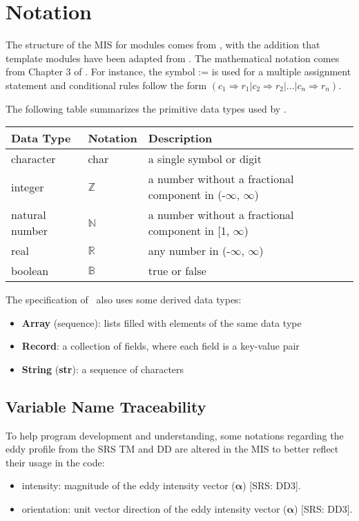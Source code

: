 \documentclass[12pt, titlepage]{article}
\begin{document}
\section{Notation}


The structure of the MIS for modules comes from \citet{HoffmanAndStrooper1995},
with the addition that template modules have been adapted from
\cite{GhezziEtAl2003}.  The mathematical notation comes from Chapter 3 of
\citet{HoffmanAndStrooper1995}.  For instance, the symbol := is used for a
multiple assignment statement and conditional rules follow the form $(c_1
\Rightarrow r_1 | c_2 \Rightarrow r_2 | ... | c_n \Rightarrow r_n )$.

The following table summarizes the primitive data types used by \progname. 

\begin{center}
\renewcommand{\arraystretch}{1.2}
\noindent 
\begin{tabular}{l l p{7.5cm}} 
\toprule 
\textbf{Data Type} & \textbf{Notation} & \textbf{Description}\\ 
\midrule
character & char & a single symbol or digit\\
integer & $\mathbb{Z}$ & a number without a fractional component in (-$\infty$, $\infty$) \\
natural number & $\mathbb{N}$ & a number without a fractional component in [1, $\infty$) \\
real & $\mathbb{R}$ & any number in (-$\infty$, $\infty$)\\
boolean & $\mathbb{B}$ & true or false \\
\bottomrule
\end{tabular} 
\end{center}

\noindent
The specification of \progname \ also uses some derived data types: 
\begin{itemize}
  \item \textbf{Array} (sequence): lists filled with elements of the same data type
  \item \textbf{Record}: a collection of fields, where each field is a key-value pair
  \item \textbf{String} (\textbf{str}): a sequence of characters 
\end{itemize}

\subsection{Variable Name Traceability}
To help program development and understanding, some notations regarding the eddy profile from the SRS TM and DD are altered in the MIS to better reflect their usage in the code:
\begin{itemize}
  \item intensity: magnitude of the eddy intensity vector ($\boldsymbol{\alpha}$) [SRS: DD3].
  \item orientation: unit vector direction of the eddy intensity vector ($\boldsymbol{\alpha}$) [SRS: DD3].
\end{itemize}
\end{document}
